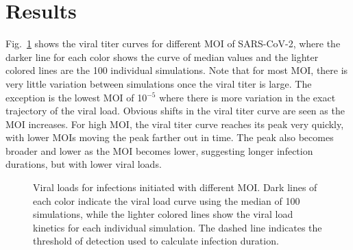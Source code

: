 \section{Results}

Fig.\ \ref{curves} shows the viral titer curves for different MOI of SARS-CoV-2, where the darker line for each color shows the curve of median values and the lighter colored lines are the 100 individual simulations. Note that for most MOI, there is very little variation between simulations once the viral titer is large. The exception is the lowest MOI of 10$^{-5}$ where there is more variation in the exact trajectory of the viral load. Obvious shifts in the viral titer curve are seen as the MOI increases. For high MOI, the viral titer curve reaches its peak very quickly, with lower MOIs moving the peak farther out in time. The peak also becomes broader and lower as the MOI becomes lower, suggesting longer infection durations, but with lower viral loads.
\begin{figure}[!h]
\begin{center}
\caption{Viral loads for infections initiated with different MOI. Dark lines of each color indicate the viral load curve using the median of 100 simulations, while the lighter colored lines show the viral load kinetics for each individual simulation. The dashed line indicates the threshold of detection used to calculate infection duration. \label{curves}}
\end{center}
\end{figure}

